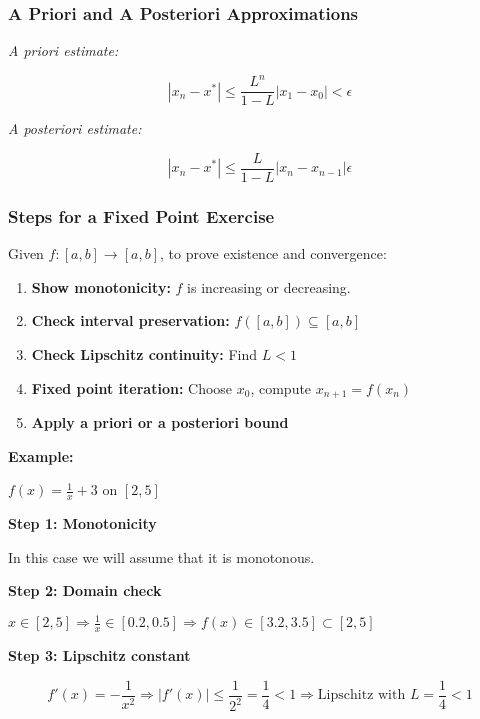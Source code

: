 \subsubsection{A Priori and A Posteriori Approximations}

\emph{A priori estimate:}

\[
    |x_n - x^*| \le \frac{L^n}{1 - L} |x_1 - x_0| < \epsilon
\]

\emph{A posteriori estimate:}

\[
    |x_n - x^*| \le \frac{L}{1 - L} |x_n - x_{n-1}| \epsilon
\]

\subsubsection{Steps for a Fixed Point Exercise}

Given \(f: [a, b] \to [a, b]\), to prove existence and convergence:

\begin{enumerate}

    \item \textbf{Show monotonicity:} \(f\) is increasing or decreasing.

    \item \textbf{Check interval preservation:} \(f([a, b]) \subseteq [a, b]\)

    \item \textbf{Check Lipschitz continuity:} Find \(L < 1\)

    \item \textbf{Fixed point iteration:} Choose \(x_0\), compute \(x_{n+1} = f(x_n)\)

    \item \textbf{Apply a priori or a posteriori bound}

\end{enumerate}

\textbf{Example:} 

\(f(x) = \frac{1}{x} + 3\) on \([2, 5]\)

\textbf{Step 1: Monotonicity}

In this case we will assume that it is monotonous. 

\textbf{Step 2: Domain check} 
 
 \(x \in [2, 5] \Rightarrow \frac{1}{x} \in [0.2, 0.5] \Rightarrow f(x) \in [3.2, 3.5] \subset [2, 5]\)

 \textbf{Step 3: Lipschitz constant}

\[
    f'(x) = -\frac{1}{x^2} \Rightarrow |f'(x)| \le \frac{1}{2^2} = \frac{1}{4} < 1
    \Rightarrow \text{Lipschitz with } L = \frac{1}{4} < 1
\]


